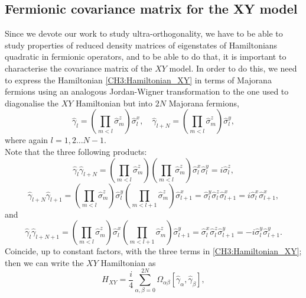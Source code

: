\subsection{Fermionic covariance matrix for the XY model}
Since we devote our work to study ultra-orthogonality, we have to be able to study properties of reduced density matrices of eigenstates of Hamiltonians quadratic in fermionic operators, and to be able to do that, it is important to characterise the covariance matrix of the $XY$ model. In order to do this, we need to express the Hamiltonian \eqref{CH3:Hamiltonian_XY} in terms of Majorana fermions using an analogous Jordan-Wigner transformation to the one used to diagonalise the $XY$ Hamiltonian but into $2N$ Majorana fermions,
\begin{equation}
\hat{\gamma}_{l}=\left(\prod_{m<l} \hat{\sigma}_{m}^{z}\right) \hat{\sigma}_{l}^{x}, \quad \hat{\gamma}_{l+N}=\left(\prod_{m<l} \hat{\sigma}_{m}^{z}\right) \hat{\sigma}_{l}^{y},
\end{equation}
where again $l=1,2\ldots N-1$.\\
\indent Note that the three following products:
\begin{equation}
\hat{\gamma}_{l} \hat{\gamma}_{l+N}=\left(\prod_{m<l} \hat{\sigma}_{m}^{z}\right)\left(\prod_{m<l} \hat{\sigma}_{m}^{z}\right) \hat{\sigma}_{l}^{x} \hat{\sigma}_{l}^{y}=i \hat{\sigma}_{l}^{z},
\end{equation}
\begin{equation}
\hat{\gamma}_{l+N} \hat{\gamma}_{l+1}=\left(\prod_{m<l} \hat{\sigma}_{m}^{z}\right) \hat{\sigma}_{l}^{y}\left(\prod_{m<l+1} \hat{\sigma}_{m}^{z}\right) \hat{\sigma}_{l+1}^{x}=\hat{\sigma}_{l}^{y} \hat{\sigma}_{l}^{z} \hat{\sigma}_{l+1}^{x}=i \hat{\sigma}_{l}^{x} \hat{\sigma}_{l+1}^{x},
\end{equation}
and
\begin{equation}
\hat{\gamma}_{l} \hat{\gamma}_{l+N+1}=\left(\prod_{m<l} \hat{\sigma}_{m}^{z}\right) \hat{\sigma}_{l}^{x}\left(\prod_{m<l+1} \hat{\sigma}_{m}^{z}\right) \hat{\sigma}_{l+1}^{y}=\hat{\sigma}_{l}^{x} \hat{\sigma}_{l}^{z} \hat{\sigma}_{l+1}^{y}=-i \hat{\sigma}_{l}^{y} \hat{\sigma}_{l+1}^{y}.
\end{equation}
Coincide, up to constant factors, with the three terms in  \eqref{CH3:Hamiltonian_XY}; then we can write the $XY$ Hamiltonian as \cite{latorre_ground_2004}
\begin{equation}
H_{X Y}=\frac{i}{4} \sum_{\alpha, \beta=0}^{2 N} \Omega_{\alpha \beta}\left[\hat{\gamma}_{\alpha}, \hat{\gamma}_{\beta}\right],
\label{CH3:Hamiltonian_to_diagonalise}
\end{equation}
